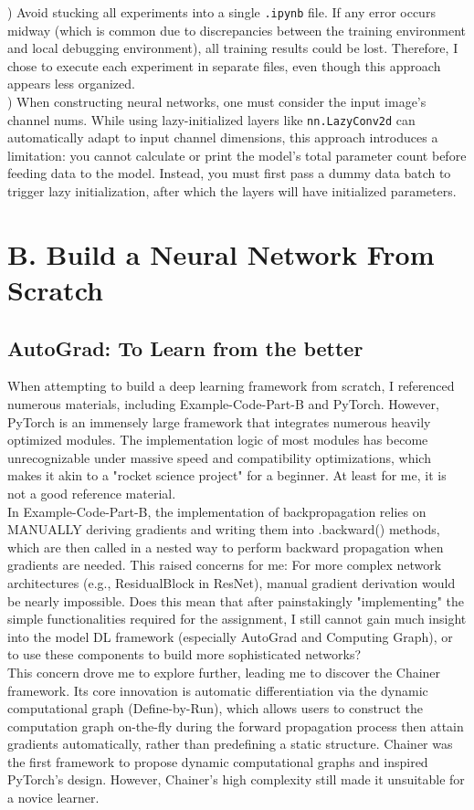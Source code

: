 \documentclass{article}
\newcommand{\subs}[1]{\subsection*{#1}}
\newcommand{\secs}[1]{\section*{#1}}
\begin{document}
) Avoid stucking all experiments into a single \texttt{.ipynb} file. If any error occurs midway (which is common due to discrepancies between the training environment and local debugging environment), all training results could be lost. Therefore, I chose to execute each experiment in separate files, even though this approach appears less organized.\\

) When constructing neural networks, one must consider the input image's channel nums. While using lazy-initialized layers like \texttt{nn.LazyConv2d} can automatically adapt to input channel dimensions, this approach introduces a limitation: you cannot calculate or print the model's total parameter count before feeding data to the model. Instead, you must first pass a dummy data batch to trigger lazy initialization, after which the layers will have initialized parameters.

\newpage
\secs{B. Build a Neural Network From Scratch}
\subs{AutoGrad: To Learn from the better}
When attempting to build a deep learning framework from scratch, I referenced numerous materials, including Example-Code-Part-B and PyTorch. However, PyTorch is an immensely large framework that integrates numerous heavily optimized modules. The implementation logic of most modules has become unrecognizable under massive speed and compatibility optimizations, which makes it akin to a "rocket science project" for a beginner. At least for me, it is not a good reference material.\\

In Example-Code-Part-B, the implementation of backpropagation relies on MANUALLY deriving gradients and writing them into .backward() methods, which are then called in a nested way to perform backward propagation when gradients are needed. This raised concerns for me: For more complex network architectures (e.g., ResidualBlock in ResNet), manual gradient derivation would be nearly impossible. Does this mean that after painstakingly "implementing" the simple functionalities required for the assignment, I still cannot gain much insight into the model DL framework (especially AutoGrad and Computing Graph), or to use these components to build more sophisticated networks?\\

This concern drove me to explore further, leading me to discover the Chainer framework. Its core innovation is automatic differentiation via the dynamic computational graph (Define-by-Run), which allows users to construct the computation graph on-the-fly during the forward propagation process then attain gradients automatically, rather than predefining a static structure. Chainer was the first framework to propose dynamic computational graphs and inspired PyTorch's design. However, Chainer's high complexity still made it unsuitable for a novice learner.\\
\end{document}
